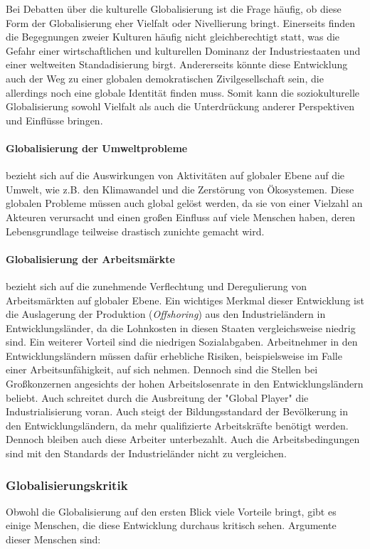 \documentclass{article}
\begin{document}
	Bei Debatten über die kulturelle Globalisierung ist die Frage häufig, ob diese Form der Globalisierung eher Vielfalt oder Nivellierung bringt. Einerseits finden die Begegnungen zweier Kulturen häufig nicht gleichberechtigt statt, was die Gefahr einer wirtschaftlichen und kulturellen Dominanz der Industriestaaten und einer weltweiten Standadisierung birgt. Andererseits könnte diese Entwicklung auch der Weg zu einer globalen demokratischen Zivilgesellschaft sein, die allerdings noch eine globale Identität finden muss. Somit kann die soziokulturelle Globalisierung sowohl Vielfalt als auch die Unterdrückung anderer Perspektiven und Einflüsse bringen.

	\paragraph{Globalisierung der Umweltprobleme}
	bezieht sich auf die Auswirkungen von Aktivitäten auf globaler Ebene auf die Umwelt, wie z.B. den Klimawandel und die Zerstörung von Ökosystemen. Diese globalen Probleme müssen auch global gelöst werden, da sie von einer Vielzahl an Akteuren verursacht und einen großen Einfluss auf viele Menschen haben, deren Lebensgrundlage teilweise drastisch zunichte gemacht wird.

	\paragraph{Globalisierung der Arbeitsmärkte}
	bezieht sich auf die zunehmende Verflechtung und Deregulierung von Arbeitsmärkten auf globaler Ebene. Ein wichtiges Merkmal dieser Entwicklung ist die Auslagerung der Produktion (\textit{Offshoring}) aus den Industrieländern in Entwicklungsländer, da die Lohnkosten in diesen Staaten vergleichsweise niedrig sind. Ein weiterer Vorteil sind die niedrigen Sozialabgaben. Arbeitnehmer in den Entwicklungsländern müssen dafür erhebliche Risiken, beispielsweise im Falle einer Arbeitsunfähigkeit, auf sich nehmen. Dennoch sind die Stellen bei Großkonzernen angesichts der hohen Arbeitslosenrate in den Entwicklungsländern beliebt. Auch schreitet durch die Ausbreitung der "Global Player" die Industrialisierung voran. Auch steigt der Bildungsstandard der Bevölkerung in den Entwicklungsländern, da mehr qualifizierte Arbeitskräfte benötigt werden. Dennoch bleiben auch diese Arbeiter unterbezahlt. Auch die Arbeitsbedingungen sind mit den Standards der Industrieländer nicht zu vergleichen.

	\subsubsection{Globalisierungskritik}
	Obwohl die Globalisierung auf den ersten Blick viele Vorteile bringt, gibt es einige Menschen, die diese Entwicklung durchaus kritisch sehen. Argumente dieser Menschen sind:
\end{document}
